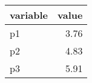 \begin{tabular}{lr}
  \hline
variable & value \\ 
  \hline
p1 & 3.76 \\ 
  p2 & 4.83 \\ 
  p3 & 5.91 \\ 
   \hline
\end{tabular}
